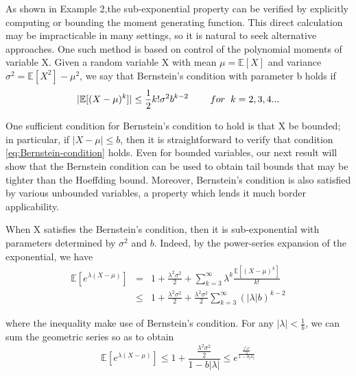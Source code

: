 \documentclass{article}[12pt]
\def\E{\mathbb{E}}
\def \E{\mathbb E}
\begin{document}
\vspace{4mm}

As shown in Example 2,the sub-exponential property can be verified by explicitly computing or bounding the moment generating function. This direct calculation may be impracticable in many settings, so it is natural to seek alternative approaches. One such method is based on control of the polynomial moments of variable X. Given a random variable X with mean $\mu = \E [X]$ and variance $\sigma^2 = \E[X^2]-\mu^2$, we say that Bernstein's condition with parameter b holds if 
\begin{equation}
|\E[(X-\mu)^k]| \leq \frac{1}{2}k!\sigma^2 b^{k-2}    \hspace{8mm}     for\hspace{2mm}  k=2,3,4...
\label{eq:Bernstein-condition}
\end{equation}

One sufficient condition for Bernstein's condition to hold is that X be bounded; in particular, if $|X-\mu|\leq b$, then it is straightforward to verify that condition \ref{eq:Bernstein-condition} holds. Even for bounded variables, our next result will show that the Bernstein condition can be used to obtain tail bounds that may be tighter than the Hoeffding bound. Moreover, Bernstein's condition is also satisfied by various unbounded variables, a property which lends it much border applicability.

When X satisfies the Bernstein's condition, then it is sub-exponential with parameters determined by $\sigma^2$ and $b$. Indeed, by  the power-series expansion of the exponential, we have 
\begin{equation}\begin{array}{rcl}
\E[e^{\lambda(X-\mu)}] &=& 1 + \frac{\lambda^2\sigma^2}{2} + \sum_{k=3}^{\infty}\lambda^k\frac{\E[(X-\mu)^k]}{k!}\\ &\leq& 1 + \frac{\lambda^2\sigma^2}{2} +\frac{\lambda^2\sigma^2}{2}\sum_{k=3}^{\infty}(|\lambda|b)^{k-2}

\end{array}
\end{equation}

where the inequality make use of Bernstein's condition. For any $|\lambda|<\frac{1}{b}$, we can sum the geometric series so as to obtain
\begin{equation}
\E[e^{\lambda(X-\mu)}] \leq 1+ \frac{\frac{\lambda^2\sigma^2}{2}}{1-b|\lambda|} \leq e^{\frac{\frac{\lambda^2\sigma^2}{2}}{1-b|\lambda|}}
\label{eq:upper bound}
\end{equation}
\end{document}
